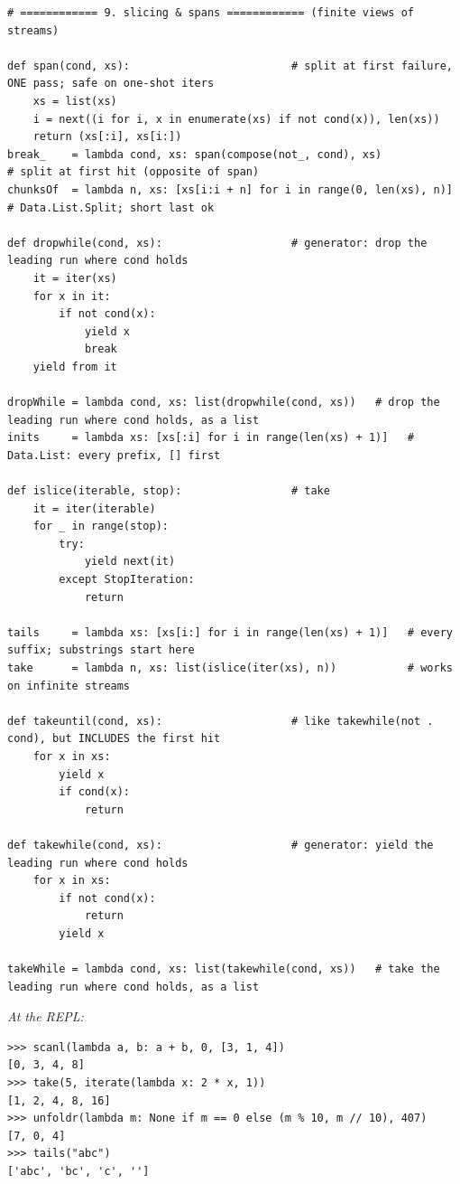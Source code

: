 \documentclass[11pt,letterpaper]{book}
\begin{document}
\begin{lstlisting}[style=code]
# ============ 9. slicing & spans ============ (finite views of streams)

def span(cond, xs):                         # split at first failure, ONE pass; safe on one-shot iters
    xs = list(xs)
    i = next((i for i, x in enumerate(xs) if not cond(x)), len(xs))
    return (xs[:i], xs[i:])
break_    = lambda cond, xs: span(compose(not_, cond), xs)             # split at first hit (opposite of span)
chunksOf  = lambda n, xs: [xs[i:i + n] for i in range(0, len(xs), n)]   # Data.List.Split; short last ok

def dropwhile(cond, xs):                    # generator: drop the leading run where cond holds
    it = iter(xs)
    for x in it:
        if not cond(x):
            yield x
            break
    yield from it

dropWhile = lambda cond, xs: list(dropwhile(cond, xs))   # drop the leading run where cond holds, as a list
inits     = lambda xs: [xs[:i] for i in range(len(xs) + 1)]   # Data.List: every prefix, [] first

def islice(iterable, stop):                 # take
    it = iter(iterable)
    for _ in range(stop):
        try:
            yield next(it)
        except StopIteration:
            return

tails     = lambda xs: [xs[i:] for i in range(len(xs) + 1)]   # every suffix; substrings start here
take      = lambda n, xs: list(islice(iter(xs), n))           # works on infinite streams

def takeuntil(cond, xs):                    # like takewhile(not . cond), but INCLUDES the first hit
    for x in xs:
        yield x
        if cond(x):
            return

def takewhile(cond, xs):                    # generator: yield the leading run where cond holds
    for x in xs:
        if not cond(x):
            return
        yield x

takeWhile = lambda cond, xs: list(takewhile(cond, xs))   # take the leading run where cond holds, as a list
\end{lstlisting}

\noindent\textit{At the REPL:}
\begin{lstlisting}[style=spec]
>>> scanl(lambda a, b: a + b, 0, [3, 1, 4])
[0, 3, 4, 8]
>>> take(5, iterate(lambda x: 2 * x, 1))
[1, 2, 4, 8, 16]
>>> unfoldr(lambda m: None if m == 0 else (m % 10, m // 10), 407)
[7, 0, 4]
>>> tails("abc")
['abc', 'bc', 'c', '']
\end{lstlisting}
\end{document}
